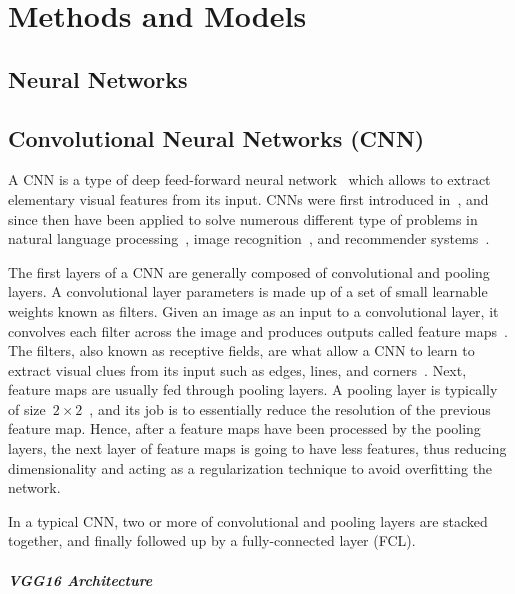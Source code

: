 \section{Methods and Models}

\subsection{Neural Networks}

\subsection{Convolutional Neural Networks (CNN)}

A CNN is a type of deep feed-forward neural network~\cite{cnn-star-galaxy} which allows to extract elementary visual features from its input. CNNs were first introduced in~\cite{Lecun99objectrecognition}, and since then have been applied to solve numerous different type of problems in  natural language processing~\cite{Collobert:2008:UAN:1390156.1390177}, image recognition~\cite{cnn-star-galaxy}, and recommender systems~\cite{NIPS2013_5004}.

The first layers of a CNN are generally composed of convolutional and pooling layers. A convolutional layer parameters is made up of a set of small learnable weights known as filters. Given an image as an input to a convolutional layer, it convolves each filter across the image and produces outputs called feature maps~\cite{cnn-star-galaxy}. The filters, also known as receptive fields, are what allow a CNN to learn to extract visual clues from its input such as edges, lines, and corners~\cite{Lecun99objectrecognition}. Next, feature maps are usually fed through pooling layers. A pooling layer is typically of size~$2 \times 2$~\cite{NIPS2012_4824}, and  its job is to essentially reduce the resolution of the previous feature map. Hence, after a feature maps have been processed by the pooling layers, the next layer of feature maps is going to have less features, thus reducing dimensionality and acting as a regularization technique to avoid overfitting the network.

In a typical CNN, two or more of convolutional and pooling layers are stacked together, and finally followed up by a fully-connected layer (FCL).

\subparagraph{VGG16 Architecture}
